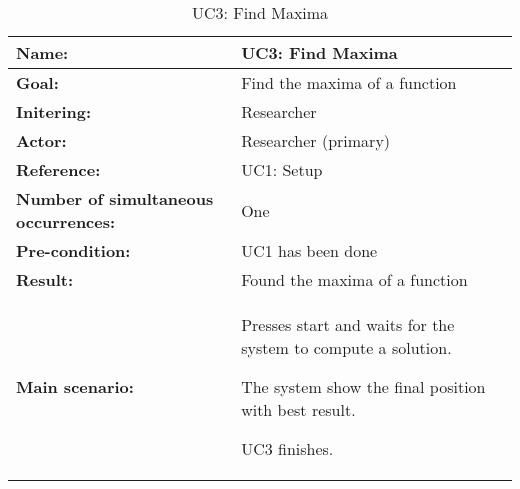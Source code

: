 \begin{table}[H]
	\begin{tabularx}{\textwidth}{| >{\raggedright\arraybackslash}p{3.3 cm} | >{\raggedright\arraybackslash}X |} \hline
		
		\textbf{Name:} 						& UC3: Find Maxima\\ \hline
		\textbf{Goal:}						& Find the maxima of a function \\ \hline
		\textbf{Initering:}					& Researcher \\ \hline
		\textbf{Actor:} 					& Researcher (primary) \\ \hline
		\textbf{Reference:} 				& UC1: Setup \\ \hline
		\textbf{Number of simultaneous occurrences:} & One \\ \hline
		\textbf{Pre-condition:} 			& UC1 has been done \\ \hline
		\textbf{Result:}					& Found the maxima of a function \\ \hline
		\textbf{Main scenario:}				& 		

		\begin{packed_enum}
	\item Presses start and waits for the system to compute a solution.
	\item The system show the final position with best result.
	\item UC3 finishes.
\end{packed_enum} \\ \hline
	\end{tabularx}
\caption{UC3: Find Maxima}
\label{tbl:uc3}
\end{table}